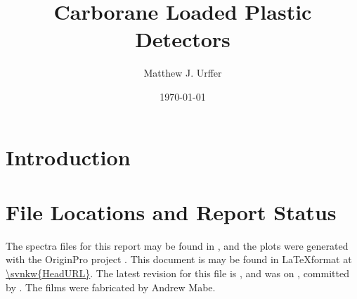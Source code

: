 \documentclass[draftcls,onecolumn]{IEEEtran}
\begin{document}
\title{Carborane Loaded Plastic Detectors}
\author{Matthew J. Urffer}
\date{\today}
\maketitle

\tableofcontents
\listoffigures
\listoftables
\section{Introduction}
\pagebreak
\appendices
\section{}
\section{File Locations and Report Status}
The spectra files for this report may be found in , and the plots were generated with the OriginPro project .
This document is may be found in \LaTeX format at \url{\svnkw{HeadURL}}.  
The latest revision for this file is \svnrev, and was on \svndate, committed by \svnauthor.
The films were fabricated by Andrew Mabe.
\end{document}

